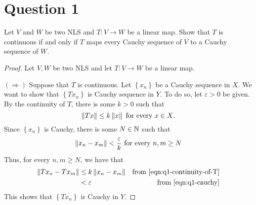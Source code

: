 \section{Question 1}
\horz
Let $V$ and $W$ be two NLS and $T: V \rightarrow W$ be a linear map. Show that $T$ is continuous if and only if $T$ maps every Cauchy sequence of $V$ to a Cauchy sequence of $W$.
\horz

\begin{proof}
    Let $V,W$ be two NLS and let $T: V\to W$ be a linear map.

    $\left( \Longrightarrow \right)$ Suppose that $T$ is continuous. Let $\left\{ x_{n} \right\}$ be a Cauchy sequence in $X$. We want to show that $\left\{ Tx_{n} \right\}$ is Cauchy sequence in $Y$. To do so, let $\varepsilon > 0$ be given. By the continuity of $T$, there is some $k> 0$ such that
    \begin{equation}
	\left\lVert Tx \right\rVert\le k\left\lVert x \right\rVert \text{ for every } x \in X\text{.}
	\label{eqn:q1-continuity-of-T}
    \end{equation}
    Since $\left\{ x_{n} \right\}$ is Cauchy, there is some $N\in \mathbb N$ such that
    \begin{equation}
	\left\lVert x_{n}-x_{m} \right\rVert < \frac{\varepsilon}{k} \text{ for every } n,m \ge N
	\label{eqn:q1-cauchy}
    \end{equation}
    Thus, for every $n,m \ge N$, we have that
    \begin{align*}
	\left\lVert Tx_{n} - Tx_{m} \right\rVert & \le k \left\lVert x_{n} - x_{m} \right\rVert & \text{from } \ref{eqn:q1-continuity-of-T} \\
	& < \varepsilon & \text{from } \ref{eqn:q1-cauchy}
    \end{align*}
    This shows that $\left\{ Tx_{n} \right\}$ is Cauchy in $Y$.


\end{proof}
